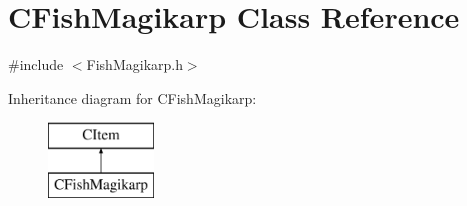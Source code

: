 \hypertarget{class_c_fish_magikarp}{}\section{C\+Fish\+Magikarp Class Reference}
\label{class_c_fish_magikarp}


{\ttfamily \#include $<$Fish\+Magikarp.\+h$>$}

Inheritance diagram for C\+Fish\+Magikarp\+:\begin{figure}[H]
\begin{center}
\leavevmode
\includegraphics[height=2.000000cm]{class_c_fish_magikarp}
\end{center}
\end{figure}
